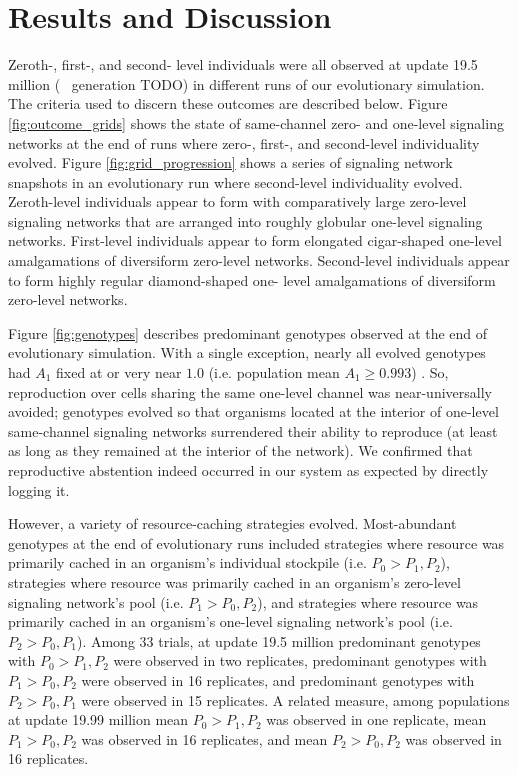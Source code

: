 \section{Results and Discussion}













Zeroth-, first-, and second- level individuals were all observed at update 19.5 million (~ generation TODO) in different runs of our evolutionary simulation.
The criteria used to discern these outcomes are described below.
Figure \ref{fig:outcome_grids} shows the state of same-channel zero- and one-level signaling networks at the end of runs where zero-, first-, and second-level individuality evolved.
Figure \ref{fig:grid_progression} shows a series of signaling network snapshots in an evolutionary run where second-level individuality evolved.
Zeroth-level individuals appear to form with comparatively large zero-level signaling networks that are arranged into roughly globular one-level signaling networks.
First-level individuals appear to form elongated cigar-shaped one-level amalgamations of diversiform zero-level networks.
Second-level individuals appear to form highly regular diamond-shaped one- level amalgamations of diversiform zero-level networks.

Figure \ref{fig:genotypes} describes predominant genotypes observed at the end of evolutionary simulation.
With a single exception, nearly all evolved genotypes had $A_1$ fixed at or very near $1.0$ (i.e. population mean $A_1 \geq 0.993$) .
So, reproduction over cells sharing the same one-level channel was near-universally avoided;
genotypes evolved so that organisms located at the interior of one-level same-channel signaling networks surrendered their ability to reproduce (at least as long as they remained at the interior of the network).
We confirmed that reproductive abstention indeed occurred in our system as expected by directly logging it.

However, a variety of resource-caching strategies evolved.
Most-abundant genotypes at the end of evolutionary runs included strategies where resource was primarily cached in an organism's individual stockpile (i.e. $P_0 > P_1, P_2$), strategies where resource was primarily cached in an organism's zero-level signaling network's pool (i.e. $P_1 > P_0, P_2$), and strategies where resource was primarily cached in an organism's one-level signaling network's pool (i.e. $P_2 > P_0, P_1$).
Among 33 trials, at update 19.5 million predominant genotypes with $P_0 > P_1, P_2$ were observed in two replicates, predominant genotypes with $P_1 > P_0, P_2$ were observed in 16 replicates, and predominant genotypes with $P_2 > P_0, P_1$ were observed in 15 replicates.
A related measure, among populations at update 19.99 million mean $P_0 > P_1, P_2$ was observed in one replicate, mean $P_1 > P_0, P_2$ was observed in 16 replicates, and mean $P_2 > P_0, P_2$ was observed in 16 replicates.

